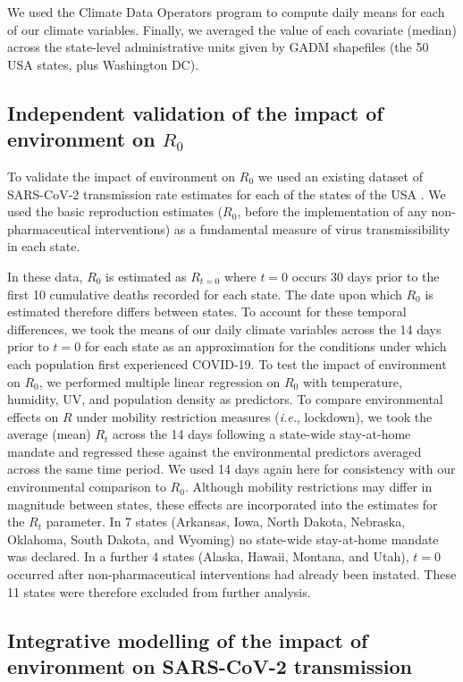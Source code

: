 \documentclass[12pt,english,a4paper]{article}
\newcommand{\virus}{SARS-CoV-2\xspace}
\newcommand{\disease}{COVID-19\xspace}
\newcommand{\RO}{$R_0$\xspace}
\begin{document}
We used the Climate Data Operators program\cite{Schulzweida2019} to compute daily means for each of our climate variables. Finally, we averaged the value of each covariate (median) across the state-level administrative units given by GADM shapefiles\cite{GADM} (the 50 USA states, plus Washington DC).


\subsection*{Independent validation of the impact of environment on \RO}

To validate the impact of environment on \RO we used an existing dataset of \virus transmission rate estimates for each of the states of the USA \cite{Unwin2020a}. 
We used the basic reproduction estimates (\RO, before the implementation of any non-pharmaceutical interventions) as a fundamental measure of virus transmissibility in each state.

In these data, \RO is estimated as $R_{t=0}$ where $t=0$ occurs 30 days prior to the first 10 cumulative deaths recorded for each state\cite{Flaxman2020a, Unwin2020a}. The date upon which \RO is estimated therefore differs between states. To account for these temporal differences, we took the means of our daily climate variables across the 14 days prior to $t=0$ for each state as an approximation for the conditions under which each population first experienced \disease.
To test the impact of environment on \RO, we performed multiple linear regression on \RO with temperature, humidity, UV, and population density as predictors. 
To compare environmental effects on $R$ under mobility restriction measures (\emph{i.e.}, lockdown), we took the average (mean) $R_t$ across the 14 days following a state-wide stay-at-home mandate and regressed these against the environmental predictors averaged across the same time period. We used 14 days again here for consistency with our environmental comparison to \RO. Although mobility restrictions may differ in magnitude between states, these effects are incorporated into the estimates for the $R_t$ parameter.
In 7 states (Arkansas, Iowa, North Dakota, Nebraska, Oklahoma, South Dakota, and Wyoming) no state-wide stay-at-home mandate was declared. In a further 4 states (Alaska, Hawaii, Montana, and Utah), $t=0$ occurred after non-pharmaceutical interventions had already been instated.
These 11 states were therefore excluded from further analysis. 


\subsection*{Integrative modelling of the impact of environment on \virus transmission}
\end{document}
